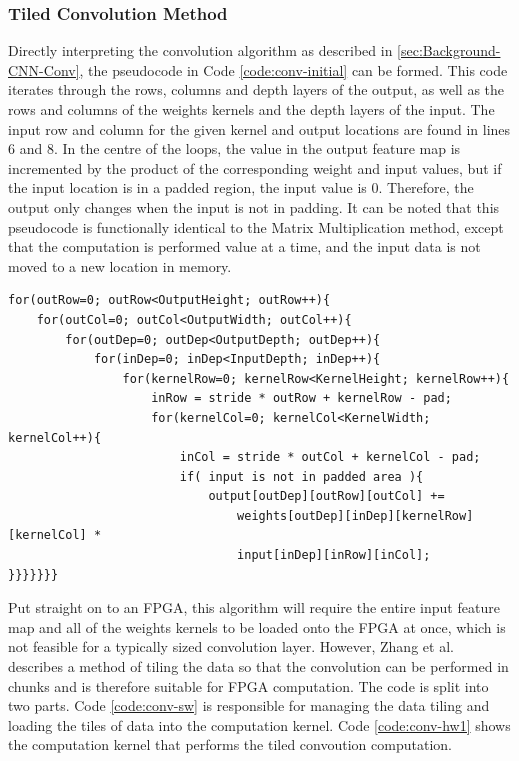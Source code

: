 \documentclass[12pt]{article}
\begin{document}
\subsubsection{Tiled Convolution Method}
\label{sec:Imp-Conv-PC}

Directly interpreting the convolution algorithm as described in \ref{sec:Background-CNN-Conv}, the pseudocode in Code \ref{code:conv-initial} can be formed. This code iterates through the rows, columns and depth layers of the output, as well as the rows and columns of the weights kernels and the depth layers of the input. The input row and column for the given kernel and output locations are found in lines 6 and 8. In the centre of the loops, the value in the output feature map is incremented by the product of the corresponding weight and input values, but if the input location is in a padded region, the input value is 0. Therefore, the output only changes when the input is not in padding. It can be noted that this pseudocode is functionally identical to the Matrix Multiplication method, except that the computation is performed value at a time, and the input data is not moved to a new location in memory.

\renewcommand{\lstlistingname}{Code}
\begin{lstlisting}[caption=Basic Convolution, label=code:conv-initial]
for(outRow=0; outRow<OutputHeight; outRow++){
	for(outCol=0; outCol<OutputWidth; outCol++){
		for(outDep=0; outDep<OutputDepth; outDep++){
			for(inDep=0; inDep<InputDepth; inDep++){      
				for(kernelRow=0; kernelRow<KernelHeight; kernelRow++){        
					inRow = stride * outRow + kernelRow - pad;
					for(kernelCol=0; kernelCol<KernelWidth; kernelCol++){          
						inCol = stride * outCol + kernelCol - pad;
						if( input is not in padded area ){
							output[outDep][outRow][outCol] +=
								weights[outDep][inDep][kernelRow][kernelCol] *
								input[inDep][inRow][inCol];
}}}}}}}
\end{lstlisting} 

Put straight on to an FPGA, this algorithm will require the entire input feature map and all of the weights kernels to be loaded onto the FPGA at once, which is not feasible for a typically sized convolution layer. However, Zhang et al. describes a method of tiling the data so that the convolution can be performed in chunks and is therefore suitable for FPGA computation. The code is split into two parts. Code \ref{code:conv-sw}  is responsible for managing the data tiling and loading the tiles of data into the computation kernel. Code \ref{code:conv-hw1} shows the computation kernel that performs the tiled convoution computation.
\end{document}
